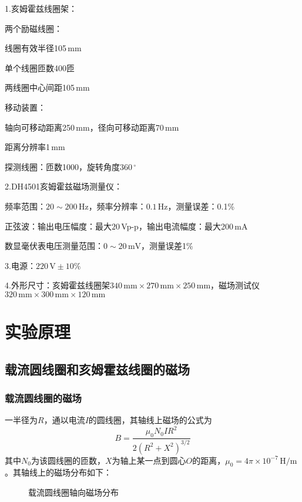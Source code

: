 \documentclass[UTF-8,twoside,cs4size]{ctexart}
\newcommand*{\tab}{\indent}
\begin{document}
	{\kaishu 1.亥姆霍兹线圈架：
		
	\tab\tab 两个励磁线圈：

	\tab\tab\tab 线圈有效半径105\,mm

	\tab\tab\tab 单个线圈匝数400匝

	\tab\tab\tab 两线圈中心间距105\,mm

	\tab\tab 移动装置：

	\tab\tab\tab 轴向可移动距离250\,mm，径向可移动距离70\,mm

	\tab\tab\tab 距离分辨率1\,mm

	\tab\tab\tab 探测线圈：匝数1000，旋转角度$ 360\,^\circ $

	2.DH4501亥姆霍兹磁场测量仪：

	\tab\tab 频率范围：$ 20\sim 200\,\mathrm{Hz} $，频率分辨率：$ 0.1\,\mathrm{Hz} $，测量误差：0.1\%

	\tab\tab 正弦波：输出电压幅度：最大$ 20\, $Vp-p，输出电流幅度：最大200\,mA

	\tab\tab 数显毫伏表电压测量范围：$ 0\sim 20\,\mathrm{mV} $，测量误差1\%

	3.电源：$ 220\,\mathrm V\pm 10\% $

	4.外形尺寸：亥姆霍兹线圈架$ 340\,\mathrm{mm}\times270\,\mathrm{mm}\times250\,\mathrm{mm} $，磁场测试仪$ 320\,\mathrm{mm}\times300\,\mathrm{mm}\times120\,\mathrm{mm} $}

	\section{实验原理}
	\subsection{载流圆线圈和亥姆霍兹线圈的磁场}
	\subsubsection{载流圆线圈的磁场}
	一半径为$ R $，通以电流$ I $的圆线圈，其轴线上磁场的公式为
	\[B=\frac{\mu_0N_0IR^2}{2(R^2+X^2)^{3/2}}\]
	其中$ N_0 $为该圆线圈的匝数，$ X $为轴上某一点到圆心$ O $的距离，$ \mu_0=4\pi\times10^{-7}\,\mathrm{H/m} $。其轴线上的磁场分布如下：
	\begin{figure}[!h]
		\centering
		\caption{载流圆线圈轴向磁场分布}
	\end{figure}
	
\end{document}
